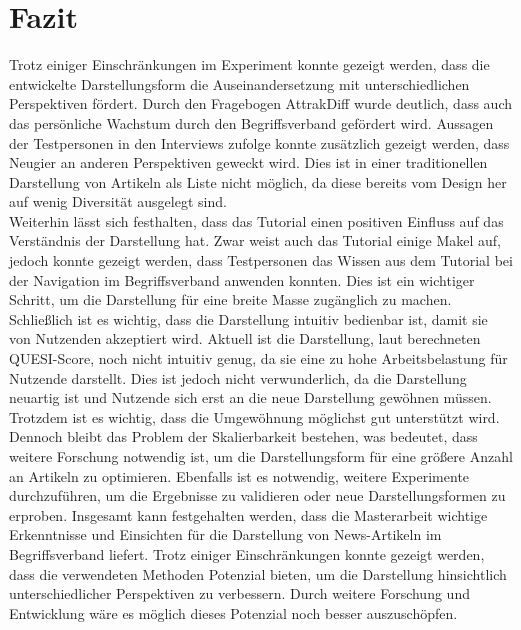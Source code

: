 \section{Fazit}\label{sec:conclusion}
Trotz einiger Einschränkungen im Experiment konnte gezeigt werden, dass die entwickelte Darstellungsform die Auseinandersetzung mit unterschiedlichen Perspektiven fördert.
Durch den Fragebogen AttrakDiff wurde deutlich, dass auch das persönliche Wachstum durch den Begriffsverband gefördert wird.
Aussagen der Testpersonen in den Interviews zufolge konnte zusätzlich gezeigt werden, dass Neugier an anderen Perspektiven geweckt wird.
Dies ist in einer traditionellen Darstellung von Artikeln als Liste nicht möglich, da diese bereits vom Design her auf wenig Diversität ausgelegt sind.\\

Weiterhin lässt sich festhalten, dass das Tutorial einen positiven Einfluss auf das Verständnis der Darstellung hat.
Zwar weist auch das Tutorial einige Makel auf, jedoch konnte gezeigt werden, dass Testpersonen das Wissen aus dem Tutorial bei der Navigation im Begriffsverband anwenden konnten.
Dies ist ein wichtiger Schritt, um die Darstellung für eine breite Masse zugänglich zu machen.
Schließlich ist es wichtig, dass die Darstellung intuitiv bedienbar ist, damit sie von Nutzenden akzeptiert wird.
Aktuell ist die Darstellung, laut berechneten \ac{QUESI}-Score, noch nicht intuitiv genug, da sie eine zu hohe Arbeitsbelastung für Nutzende darstellt.
Dies ist jedoch nicht verwunderlich, da die Darstellung neuartig ist und Nutzende sich erst an die neue Darstellung gewöhnen müssen.
Trotzdem ist es wichtig, dass die Umgewöhnung möglichst gut unterstützt wird. \\

Dennoch bleibt das Problem der Skalierbarkeit bestehen, was bedeutet, dass weitere Forschung notwendig ist, um die Darstellungsform für eine größere Anzahl an Artikeln zu optimieren.
Ebenfalls ist es notwendig, weitere Experimente durchzuführen, um die Ergebnisse zu validieren oder neue Darstellungsformen zu erproben.
Insgesamt kann festgehalten werden, dass die Masterarbeit wichtige Erkenntnisse und Einsichten für die Darstellung von News-Artikeln im Begriffsverband liefert.
Trotz einiger Einschränkungen konnte gezeigt werden, dass die verwendeten Methoden Potenzial bieten, um die Darstellung hinsichtlich unterschiedlicher Perspektiven zu verbessern.
Durch weitere Forschung und Entwicklung wäre es möglich dieses Potenzial noch besser auszuschöpfen.
